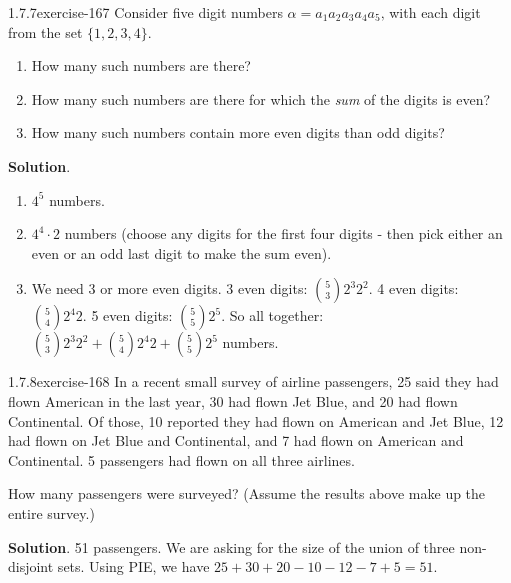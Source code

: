 \documentclass[twoside,11pt,]{book}
\numberwithin{equation}{chapter}
\begin{document}
\begin{divisionsolution}{1.7.7}{}{exercise-167}%
\hypertarget{p-2743}{}%
Consider five digit numbers \(\alpha = a_1a_2a_3a_4a_5\text{,}\) with each digit from the set \(\{1,2,3,4\}\text{.}\)\leavevmode%
\begin{enumerate}[label=(\alph*)]
\item\hypertarget{li-1630}{}\hypertarget{p-2744}{}%
How many such numbers are there?%
\item\hypertarget{li-1631}{}\hypertarget{p-2746}{}%
How many such numbers are there for which the \emph{sum} of the digits is even?%
\item\hypertarget{li-1632}{}\hypertarget{p-2748}{}%
How many such numbers contain more even digits than odd digits?%
\end{enumerate}
%
\par\smallskip%
\noindent\textbf{Solution}.\quad%
\hypertarget{p-2750}{}%
\leavevmode%
\begin{enumerate}[label=(\alph*)]
\item\hypertarget{li-1633}{}\hypertarget{p-2751}{}%
\(4^5\) numbers.%
\item\hypertarget{li-1634}{}\hypertarget{p-2752}{}%
\(4^4\cdot 2\) numbers (choose any digits for the first four digits - then pick either an even or an odd last digit to make the sum even).%
\item\hypertarget{li-1635}{}\hypertarget{p-2753}{}%
We need 3 or more even digits. 3 even digits: \({5 \choose 3}2^3 2^2\text{.}\) 4 even digits: \({5 \choose 4}2^4 2\text{.}\) 5 even digits: \({5 \choose 5}2^5\text{.}\) So all together: \({5 \choose 3}2^3 2^2 + {5 \choose 4}2^4 2 + {5 \choose 5}2^5\) numbers.%
\end{enumerate}
%
\end{divisionsolution}%
\begin{divisionsolution}{1.7.8}{}{exercise-168}%
\hypertarget{p-2758}{}%
In a recent small survey of airline passengers, 25 said they had flown American in the last year, 30 had flown Jet Blue, and 20 had flown Continental. Of those, 10 reported they had flown on American and Jet Blue, 12 had flown on Jet Blue and Continental, and 7 had flown on American and Continental. 5 passengers had flown on all three airlines.%
\par
\hypertarget{p-2759}{}%
How many passengers were surveyed? (Assume the results above make up the entire survey.)%
\par\smallskip%
\noindent\textbf{Solution}.\quad%
\hypertarget{p-2761}{}%
51 passengers. We are asking for the size of the union of three non-disjoint sets. Using PIE, we have \(25+30+20-10 -12-7+5 = 51\text{.}\)%
\end{divisionsolution}%
\end{document}
